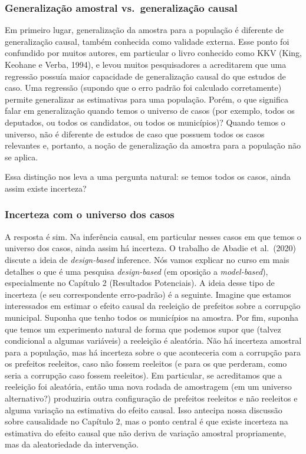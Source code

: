 \documentclass[
]{article}
\begin{document}
\subsubsection{Generalização amostral vs.~generalização causal}\label{generalizauxe7uxe3o-amostral-vs.-generalizauxe7uxe3o-causal}

Em primeiro lugar, generalização da amostra para a população é diferente de generalização causal, também conhecida como validade externa. Esse ponto foi confundido por muitos autores, em particular o livro conhecido como KKV (King, Keohane e Verba, 1994), e levou muitos pesquisadores a acreditarem que uma regressão possuía maior capacidade de generalização causal do que estudos de caso. Uma regressão (supondo que o erro padrão foi calculado corretamente) permite generalizar as estimativas para uma população. Porém, o que significa falar em generalização quando temos o universo de casos (por exemplo, todos os deputados, ou todos os candidatos, ou todos os municípios)? Quando temos o universo, não é diferente de estudos de caso que possuem todos os casos relevantes e, portanto, a noção de generalização da amostra para a população não se aplica.

Essa distinção nos leva a uma pergunta natural: se temos todos os casos, ainda assim existe incerteza?

\subsubsection{Incerteza com o universo dos casos}\label{incerteza-com-o-universo-dos-casos}

A resposta é sim. Na inferência causal, em particular nesses casos em que temos o universo dos casos, ainda assim há incerteza. O trabalho de Abadie et al.~(2020) discute a ideia de \emph{design-based} inference. Nós vamos explicar no curso em mais detalhes o que é uma pesquisa \emph{design-based} (em oposição a \emph{model-based}), especialmente no Capítulo 2 (Resultados Potenciais). A ideia desse tipo de incerteza (e seu correspondente erro-padrão) é a seguinte. Imagine que estamos interessados em estimar o efeito causal da reeleição de prefeitos sobre a corrupção municipal. Suponha que tenho todos os municípios na amostra. Por fim, suponha que temos um experimento natural de forma que podemos supor que (talvez condicional a algumas variáveis) a reeleição é aleatória. Não há incerteza amostral para a população, mas há incerteza sobre o que aconteceria com a corrupção para os prefeitos reeleitos, caso não fossem reeleitos (e para os que perderam, como seria a corrupção caso fossem reeleitos). Em particular, se acreditamos que a reeleição foi aleatória, então uma nova rodada de amostragem (em um universo alternativo?) produziria outra configuração de prefeitos reeleitos e não reeleitos e alguma variação na estimativa do efeito causal. Isso antecipa nossa discussão sobre causalidade no Capítulo 2, mas o ponto central é que existe incerteza na estimativa do efeito causal que não deriva de variação amostral propriamente, mas da aleatoriedade da intervenção.
\end{document}
